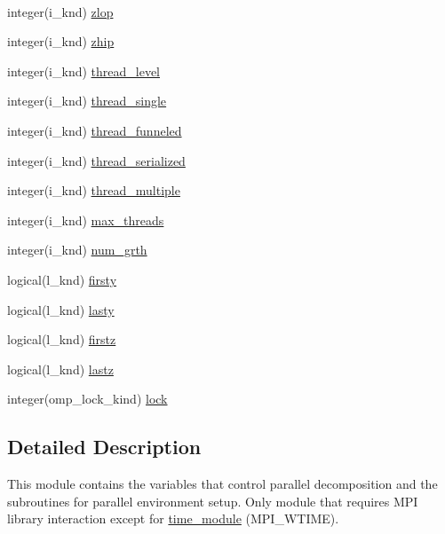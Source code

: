 \begin{DoxyCompactItemize}
$$\item 
integer(i\-\_\-knd) \hyperlink{classplib__module_a3a7c2d7b52bbd28281bd1affd1d50bf1}{zlop}
\item 
integer(i\-\_\-knd) \hyperlink{classplib__module_ac18f767501ee98501fbf13da3185aae7}{zhip}
\item 
integer(i\-\_\-knd) \hyperlink{classplib__module_a704c693732d15c474f76b340e3b1c54f}{thread\-\_\-level}
\item 
integer(i\-\_\-knd) \hyperlink{classplib__module_a976973aed6846d0da2cc7fc29e0f0097}{thread\-\_\-single}
\item 
integer(i\-\_\-knd) \hyperlink{classplib__module_aaf61faf216e801843c4b8121eab84956}{thread\-\_\-funneled}
\item 
integer(i\-\_\-knd) \hyperlink{classplib__module_a117ac57a3b41c9fae508f8674fe45f0f}{thread\-\_\-serialized}
\item 
integer(i\-\_\-knd) \hyperlink{classplib__module_af4045f02bfdd6ce98120023046d4c1ca}{thread\-\_\-multiple}
\item 
integer(i\-\_\-knd) \hyperlink{classplib__module_aac421ecf4251867c4bff7045095d596c}{max\-\_\-threads}
\item 
integer(i\-\_\-knd) \hyperlink{classplib__module_a8238cefc81a445bee3e137bb94f75e91}{num\-\_\-grth}
\item 
logical(l\-\_\-knd) \hyperlink{classplib__module_acacb5f9f63dcc742ef176b99534fe626}{firsty}
\item 
logical(l\-\_\-knd) \hyperlink{classplib__module_ac8204e5b33211c1fe40e991a11d63f95}{lasty}
\item 
logical(l\-\_\-knd) \hyperlink{classplib__module_a2d791ed6cdd38a29604dcb99a7a556fe}{firstz}
\item 
logical(l\-\_\-knd) \hyperlink{classplib__module_a5d6addca95cdb6299949d278355bed3b}{lastz}
\item 
integer(omp\-\_\-lock\-\_\-kind) \hyperlink{classplib__module_a3f4964cd381feb76e21407e3b96915c9}{lock}
\end{DoxyCompactItemize}


\subsection{Detailed Description}
This module contains the variables that control parallel decomposition and the subroutines for parallel environment setup. Only module that requires M\-P\-I library interaction except for \hyperlink{classtime__module}{time\-\_\-module} (M\-P\-I\-\_\-\-W\-T\-I\-M\-E). 

